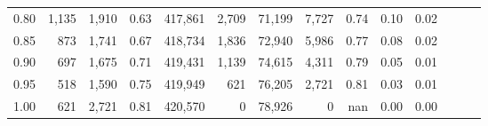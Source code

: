 \begin{tabular}{rrrrrrrrrrrrrr}
0.80 &    1,135 &  1,910 &  0.63 &  417,861 &    2,709 &  71,199 &   7,727 &  0.74 &  0.10 &      0.02 \\
0.85 &      873 &  1,741 &  0.67 &  418,734 &    1,836 &  72,940 &   5,986 &  0.77 &  0.08 &      0.02 \\
0.90 &      697 &  1,675 &  0.71 &  419,431 &    1,139 &  74,615 &   4,311 &  0.79 &  0.05 &      0.01 \\
0.95 &      518 &  1,590 &  0.75 &  419,949 &      621 &  76,205 &   2,721 &  0.81 &  0.03 &      0.01 \\
1.00 &      621 &  2,721 &  0.81 &  420,570 &        0 &  78,926 &       0 &   nan &  0.00 &      0.00 \\
\bottomrule
\end{tabular}
